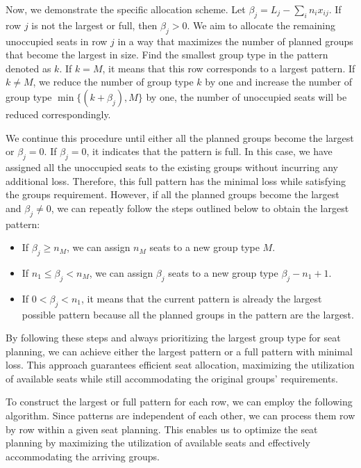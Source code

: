 Now, we demonstrate the specific allocation scheme.
Let $\beta_{j}= L_{j} - \sum_{i} n_{i} x_{ij}$. If row $j$ is not the largest or full, then $\beta_{j} > 0$. 
We aim to allocate the remaining unoccupied seats in row $j$ in a way that maximizes the number of planned groups that become the largest in size. Find the smallest group type in the pattern denoted as $k$. If $k = M$, it means that this row corresponds to a largest pattern. If $k \neq M$, we reduce the number of group type $k$ by one and increase the number of group type $\min \{(k+\beta_{j}), M\}$ by one, the number of unoccupied seats will be reduced correspondingly.

We continue this procedure until either all the planned groups become the largest or $\beta_{j} = 0$. If $\beta_{j} = 0$, it indicates that the pattern is full. In this case, we have assigned all the unoccupied seats to the existing groups without incurring any additional loss. Therefore, this full pattern has the minimal loss while satisfying the groups requirement. However, if all the planned groups become the largest and $\beta_{j} \neq 0$, we can repeatly follow the steps outlined below to obtain the largest pattern:

\begin{itemize}
  \item If $\beta_{j} \geq n_{M}$, we can assign $n_M$ seats to a new group type $M$.

  \item If $n_{1} \leq \beta_{j} < n_{M}$, we can assign $\beta_{j}$ seats to a new group type $\beta_{j}-n_{1}+1$.
  \item If $0 < \beta_{j} < n_{1}$, it means that the current pattern is already the largest possible pattern because all the planned groups in the pattern are the largest.
\end{itemize}

By following these steps and always prioritizing the largest group type for seat planning, we can achieve either the largest pattern or a full pattern with minimal loss. This approach guarantees efficient seat allocation, maximizing the utilization of available seats while still accommodating the original groups' requirements.

To construct the largest or full pattern for each row, we can employ the following algorithm. Since patterns are independent of each other, we can process them row by row within a given seat planning. This enables us to optimize the seat planning by maximizing the utilization of available seats and effectively accommodating the arriving groups.

